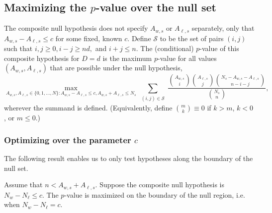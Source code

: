 \subsection{Maximizing the $p$-value over the null set}

The composite null hypothesis does not specify $A_{w,s}$ or $A_{\ell,s}$ separately, only 
that $A_{w,s} - A_{\ell,s} \le c$ for
some fixed, known $c$.
Define $\mathcal{S}$ to be the set of pairs $(i, j)$ such that $i, j\ge 0, i-j \ge nd,$ and $ i+j \leq n$.
The (conditional) $p$-value of this composite hypothesis for $D=d$ is the maximum $p$-value for all
values $(A_{w,s}, A_{\ell,s})$ that are possible under the null hypothesis,
\begin{equation}
  \max_{A_{w,s}, A_{\ell,s} \in \{0, 1, \ldots, N \}: A_{w,s} - A_{\ell,s} \le c, A_{w,s} + A_{\ell,s} \le N_s}
   \sum_{\substack{(i, j)\in \mathcal{S}}} \frac{ {A_{w,s } \choose i}{A_{\ell,s} \choose j}{N_s - A_{w,s} - A_{\ell,s} \choose n-i-j}}{{N_s \choose n}},
\end{equation}
wherever the summand is defined. 
(Equivalently, define ${m \choose k} \equiv 0$ if $k > m$, $k < 0$, or $m \le 0$.)

\subsubsection{Optimizing over the parameter $c$}
The following result enables us to only test hypotheses along the boundary of the null set.

\begin{thm}
Assume that $n < A_{w,s}+A_{\ell,s}$.
Suppose the composite null hypothesis is $N_w - N_\ell \leq c$.
The $p$-value is maximized on the boundary of the null region, i.e. when $N_w - N_\ell = c$.
\end{thm}


